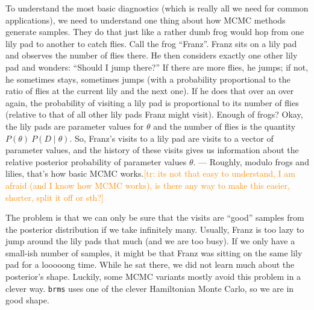 \documentclass[nobib]{tufte-handout}
\newcommand{\tr}[1]{\textcolor{DarkOrange}{[tr: #1]}}
\begin{document}
\begin{InfoBox}[]
{\begin{minipage}{1\textwidth}
    To understand the most basic diagnostics (which is really all we need for common applications), we need to understand one thing about how MCMC methods generate
    samples. They do that just like a rather dumb frog would hop from one lily pad to another
    to catch flies. Call the frog ``Franz''. Franz sits on a
    lily pad and observes the number of flies there. He then considers exactly one other lily
    pad and wonders: ``Should I jump there?'' If there are more flies, he jumps; if
    not, he sometimes stays, sometimes jumps (with a probability proportional to the ratio of
    flies at the current lily and the next one). If he does that over an over again, the probability of visiting a
    lily pad is proportional to its number of flies (relative to that of all other lily pads
    Franz might visit). Enough of frogs? Okay, the lily pads are parameter values for
    $\theta$ and the number of flies is the quantity $P(\theta) \ P(D \mid \theta)$. So,
    Franz's visits to a lily pad are visits to a vector of parameter values, and
    the history of these visits gives us information about the relative posterior probability
    of parameter values $\theta$. --- Roughly, modulo frogs and lilies, that's how basic MCMC
    works.\tr{its not that easy to understand, I am afraid (and I know how MCMC works), is there any way to make this easier, shorter, split it off or sth?}

    The problem is that we can only be sure that the visits are ``good'' samples from the posterior
    distribution if we take infinitely many. Usually, Franz is too lazy to jump around the lily pads that much (and we are too busy). If we only have a small-ish number of samples, it might be that
    Franz was sitting on the same lily pad for a looooong time. While he
    sat there, we did not learn much about the posterior's shape. Luckily, some MCMC variants mostly avoid this problem in a clever way. \texttt{brms} uses one of the clever Hamiltonian Monte Carlo, so we are in good shape.
    

\end{minipage}}
\end{InfoBox}
\end{document}
